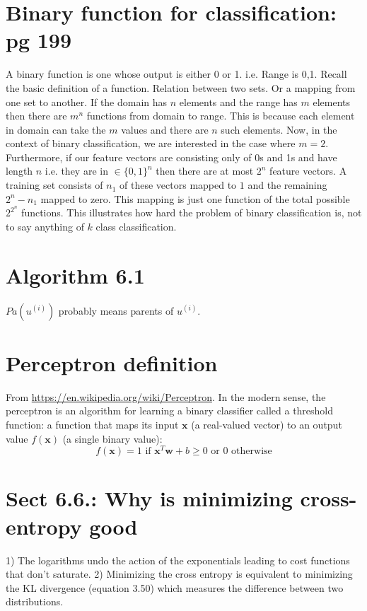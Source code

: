 \documentclass{article}
\newcommand{\beq}{\begin{equation}}
\newcommand{\eeq}{\end{equation}}
\begin{document}
\section{Binary function for classification: pg 199 }
A binary function is one whose output is either 0 or 1. i.e. Range is {0,1}. Recall the basic definition of a function. Relation between two sets. Or a mapping from one set to another. If the domain has $n$ elements and the range has $m$ elements then there are $m^n$ functions from domain to range. This is because each element in domain can take the $m$ values  and there are $n$ such elements. Now, in the context of binary classification, we are interested in the case where $m=2$. Furthermore, if our feature vectors are consisting only of 0s and 1s and have length $n$ i.e. they are in $\in\{0,1\}^n$ then there are at most $2^n$ feature vectors. A training set consists of $n_1$ of these vectors mapped to $1$ and the remaining $2^n-n_1$ mapped to zero. This mapping is just one function of the total possible $2^{2^n}$ functions. This illustrates how hard the problem of binary classification is, not to say anything of $k$ class classification.
%
%
%
\section{Algorithm 6.1}
$Pa(u^{(i)})$ probably means parents of $u^{(i)}$.
\section{Perceptron definition}
From \url{https://en.wikipedia.org/wiki/Perceptron}. In the modern sense, the perceptron is an algorithm for learning a binary classifier called a threshold function: a function that maps its input {$\mathbf {x}$} (a real-valued vector) to an output value $f(\mathbf{x})$ (a single binary value):
\beq
f(\mathbf{x}) = 1 \text{ if } \mathbf{x}^T\mathbf{w} + b \ge 0   \text{ or 0 otherwise} 
\eeq
\section{Sect 6.6.: Why is minimizing cross-entropy good}
1) The logarithms undo the action of the exponentials leading to cost functions that don't saturate.
2) Minimizing the cross entropy is equivalent to minimizing the KL divergence (equation 3.50) which measures the difference between two distributions.
%
%
%
\end{document}
